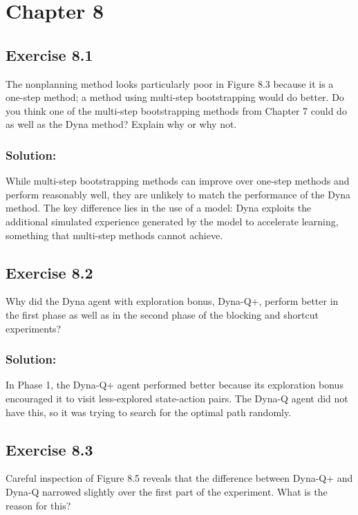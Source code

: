 \section*{Chapter 8}

\subsection*{Exercise 8.1}
The nonplanning method looks particularly poor in Figure 8.3 because it is
a one-step method; a method using multi-step bootstrapping would do better. Do you
think one of the multi-step bootstrapping methods from Chapter 7 could do as well as
the Dyna method? Explain why or why not.

\subsubsection*{Solution:}
While multi-step bootstrapping methods can improve over one-step methods and perform
reasonably well, they are unlikely to match the performance of the Dyna method. The key
difference lies in the use of a model: Dyna exploits the additional simulated experience
generated by the model to accelerate learning, something that multi-step methods cannot
achieve.

\subsection*{Exercise 8.2}
Why did the Dyna agent with exploration bonus, Dyna-Q+, perform
better in the first phase as well as in the second phase of the blocking and shortcut
experiments?

\subsubsection*{Solution:}

In Phase 1, the Dyna-Q+ agent performed better because its exploration bonus encouraged
it to visit less-explored state-action pairs. The Dyna-Q agent did not have this,
so it was trying to search for the optimal path randomly.

\subsection*{Exercise 8.3}
Careful inspection of Figure 8.5 reveals that the difference between Dyna-Q+
and Dyna-Q narrowed slightly over the first part of the experiment. What is the reason
for this?

